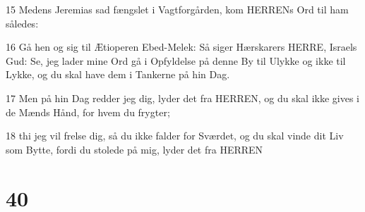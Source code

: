 \par 15 Medens Jeremias sad fængslet i Vagtforgården, kom HERRENs Ord til ham således:
\par 16 Gå hen og sig til Ætioperen Ebed-Melek: Så siger Hærskarers HERRE, Israels Gud: Se, jeg lader mine Ord gå i Opfyldelse på denne By til Ulykke og ikke til Lykke, og du skal have dem i Tankerne på hin Dag.
\par 17 Men på hin Dag redder jeg dig, lyder det fra HERREN, og du skal ikke gives i de Mænds Hånd, for hvem du frygter;
\par 18 thi jeg vil frelse dig, så du ikke falder for Sværdet, og du skal vinde dit Liv som Bytte, fordi du stolede på mig, lyder det fra HERREN

\chapter{40}

